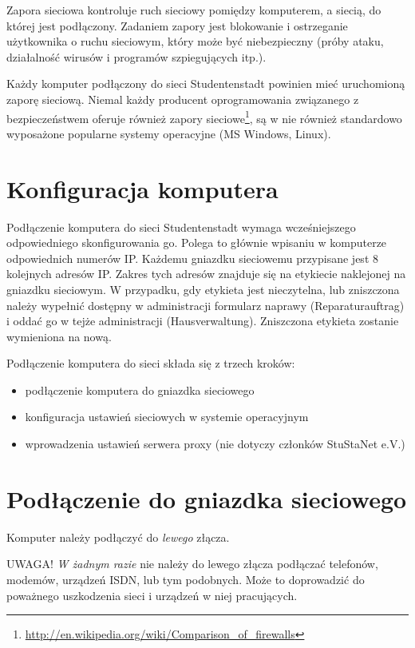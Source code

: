 \documentclass[a4paper,12pt]{scrartcl}
\begin{document}
Zapora sieciowa kontroluje ruch sieciowy pomiędzy komputerem, a siecią, do której jest podłączony. Zadaniem zapory jest blokowanie i ostrzeganie użytkownika o ruchu sieciowym, który może być niebezpieczny (próby ataku, działalność wirusów i programów szpiegujących itp.). 

Każdy komputer podłączony do sieci Studentenstadt powinien mieć uruchomioną zaporę sieciową. Niemal każdy producent oprogramowania związanego z bezpieczeństwem oferuje również zapory sieciowe\footnote{\url{http://en.wikipedia.org/wiki/Comparison_of_firewalls}}, są w nie również standardowo wyposażone popularne systemy operacyjne (MS Windows, Linux). 


\newpage

\section*{Konfiguracja komputera}

Podłączenie komputera do sieci Studentenstadt wymaga wcześniejszego odpowiedniego skonfigurowania go. Polega to głównie wpisaniu w komputerze odpowiednich numerów IP. Każdemu gniazdku sieciowemu przypisane jest 8 kolejnych adresów IP. Zakres tych adresów znajduje się na etykiecie naklejonej na gniazdku sieciowym. W przypadku, gdy etykieta jest nieczytelna, lub zniszczona należy wypełnić dostępny w administracji formularz naprawy (Reparaturauftrag) i oddać go w tejże administracji (Hausverwaltung). Zniszczona etykieta zostanie wymieniona na nową.

Podłączenie komputera do sieci składa się z trzech kroków:

\begin{itemize}
    \item podłączenie komputera do gniazdka sieciowego
    \item konfiguracja ustawień sieciowych w systemie operacyjnym
    \item wprowadzenia ustawień serwera proxy (nie dotyczy członków StuStaNet e.V.)
\end{itemize}

\section*{Podłączenie do gniazdka sieciowego}

Komputer należy podłączyć do \emph{lewego} złącza.

UWAGA! \emph{W żadnym razie} nie należy do lewego złącza podłączać telefonów, modemów, urządzeń ISDN, lub tym podobnych. Może to doprowadzić do poważnego uszkodzenia sieci i urządzeń w niej pracujących.
\end{document}
